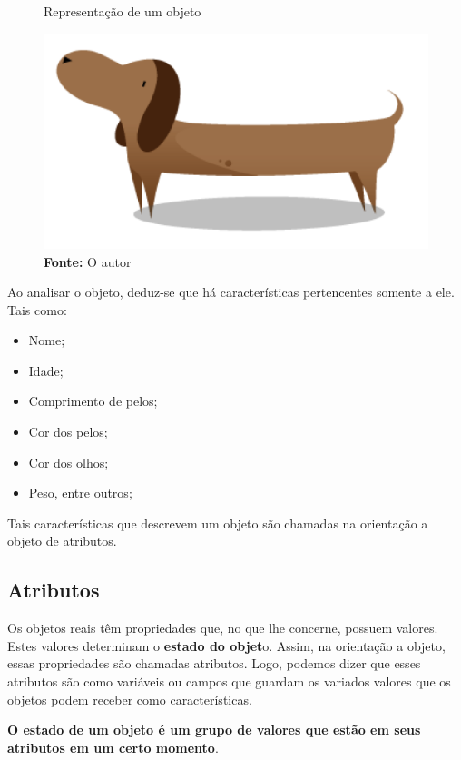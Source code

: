 \begin{figure}[H]
  \centering
  \caption{Representação de um objeto}
  \includegraphics[scale=0.4]{imagens/cachorro-objeto.png}
  \caption{\textbf{Fonte:} O autor}
  \label{fig:cachorro-objeto}
\end{figure}

Ao analisar o objeto, deduz-se que há características pertencentes somente a 
ele. Tais como:

\begin{itemize}
  \item Nome;
  \item Idade;
  \item Comprimento de pelos;
  \item Cor dos pelos;
  \item Cor dos olhos;
  \item Peso, entre outros;
\end{itemize}

Tais características que descrevem um objeto são chamadas na orientação a  objeto de atributos.

\subsection{Atributos}

Os objetos reais têm propriedades que, no que lhe concerne, possuem valores. 
Estes valores determinam o \textbf{estado do objet}o. Assim, na orientação a objeto, 
essas propriedades são chamadas atributos. Logo, podemos dizer que esses atributos são como variáveis ou campos que guardam os variados valores que os objetos podem receber como características.

\textbf{O estado de um objeto é um grupo de valores que estão em seus atributos em um certo momento}. \\

